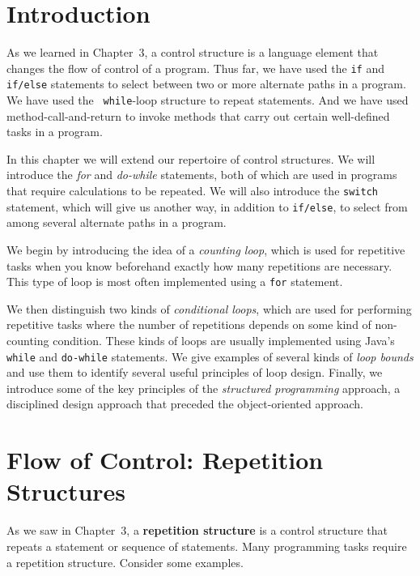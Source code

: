 \section{Introduction}
\label{introduction}
\noindent As we learned in Chapter~3, a control structure is a language 
element that changes the flow of control of a program. Thus far, we
have used the {\tt if} and {\tt if/else} statements to select between
two or more alternate paths in a program.  We have used the {\tt
while}-loop structure to repeat statements. And we have used
method-call-and-return to invoke methods that carry out certain
well-defined tasks in a program.

In this chapter we will extend our repertoire of control structures.
We will introduce the {\it for} and {\it do-while} statements, both of
which are used in programs that require calculations to be repeated.
We will also introduce the {\tt switch} statement, which will give us
another way, in addition to {\tt if/else}, to select from among
several alternate paths in a program.

We begin by introducing the idea of a {\it counting loop}, which is
used for repetitive tasks when you know beforehand exactly how many
repetitions are necessary.  This type of loop is most often
implemented using a {\tt for} statement.

We then distinguish two kinds of {\it conditional loops}, which are
used for performing repetitive tasks where the number of repetitions
depends on some kind of non-counting condition. These kinds of loops
are usually implemented using Java's {\tt while} and {\tt do-while}
statements.  We give examples of several kinds of {\em loop bounds}
and use them to identify several useful principles of loop design.
Finally, we introduce some of the key principles of the {\it
structured programming} approach, a disciplined design approach that
preceded the object-oriented approach.

\section{Flow of Control: Repetition Structures}
\label{flowof-control-repetition-structures}
\noindent As we saw in Chapter~3, a {\bf repetition structure} is a control
structure that repeats a statement or sequence of statements.  Many
programming tasks require a repetition structure.  Consider some
examples.

